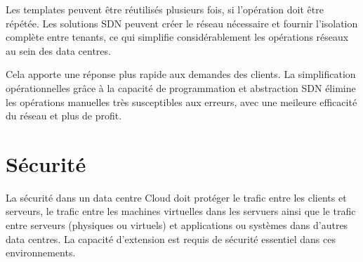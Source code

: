 Les templates peuvent être réutilisés plusieurs fois, si l'opération doit être répétée. Les solutions SDN peuvent créer le réseau nécessaire et fournir l'isolation complète entre tenants, ce qui simplifie considérablement les opérations réseaux au sein des data centres. 

Cela apporte une réponse plus rapide aux demandes des clients. La simplification opérationnelles grâce à la capacité de programmation et abstraction SDN élimine les opérations manuelles très susceptibles aux erreurs, avec une meileure efficacité du réseau et plus de profit.

\section{Sécurité}

La sécurité dans un data centre Cloud doit protéger le trafic entre les clients et serveurs, le trafic entre les machines virtuelles dans les servuers ainsi que le trafic entre serveurs (physiques ou virtuels) et applications ou systèmes dans d'autres data centres. La capacité d'extension est requis de sécurité essentiel dans ces environnements. 




